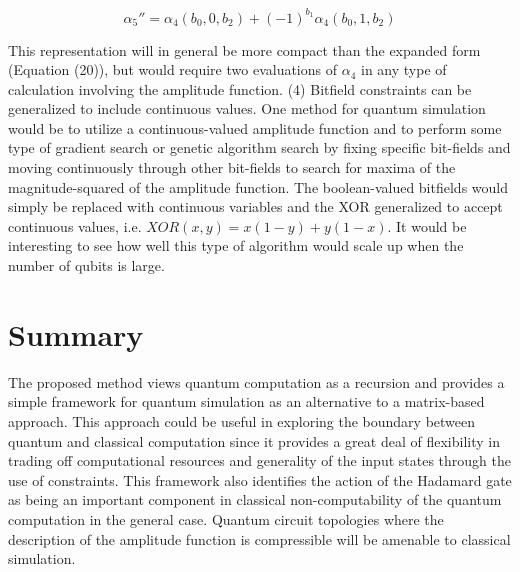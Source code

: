 \documentclass[reqno]{amsart}
\theoremstyle{definition}
\theoremstyle{remark}
\begin{document}
\begin{equation}
\alpha_5''  = \alpha_4 (b_0,0,b_2) + (-1)^{b_1}\alpha_4 (b_0,1,b_2)
\end{equation}
\newline

\noindent
This representation will in general be more compact than the expanded form (Equation (20)), but would require two evaluations of $\alpha_4$ in any type of calculation involving the amplitude function. \newline
\newline
\noindent
(4) Bitfield constraints can be generalized to include continuous values. One method for quantum simulation would be to utilize a continuous-valued amplitude function and to perform some type of gradient search or genetic algorithm search by fixing specific bit-fields and moving continuously through other bit-fields to search for maxima of the magnitude-squared of the amplitude function. The boolean-valued bitfields would simply be replaced with continuous variables and the XOR generalized to accept continuous values, i.e. $XOR(x,y)=x(1-y)+y(1-x)$. It would be interesting to see how well this type of algorithm would scale up when the number of qubits is large.


\newpage
\section{Summary}
\noindent
The proposed method views quantum computation as a recursion and provides a simple framework for quantum simulation as an alternative to a matrix-based approach. This approach could be useful in exploring the boundary between quantum and classical computation since it provides a great deal of flexibility in trading off computational resources and generality of the input states through the use of constraints. This framework also identifies the action of the Hadamard gate as being an important component in classical non-computability of the quantum computation in the general case. Quantum circuit topologies where the description of the amplitude function is compressible will be amenable to classical simulation.




\end{document}
